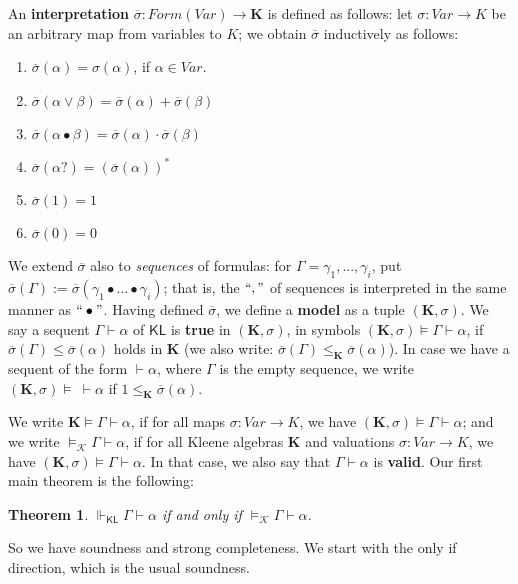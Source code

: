 \documentclass{eptcs}
\newtheorem{thm}[defn]{Theorem}
\newcommand{\KA}{\mathcal{K}}
\newcommand{\osigma}{\overline{\sigma}}
\newcommand{\KL}{\mathsf{KL}}
\begin{document}
An \textbf{interpretation} 
$\overline{\sigma}:\textit{Form}(\textit{Var})\rightarrow\textbf{K}$ is defined as
follows: let $\sigma:\textit{Var}\rightarrow K$ be an arbitrary
map from variables to $K$; 
we obtain $\overline{\sigma}$ inductively as follows:
\begin{enumerate}
\item $\osigma(\alpha)=\sigma(\alpha)$, if $\alpha\in \textit{Var}$.
\item $\osigma(\alpha\vee\beta)=\osigma(\alpha)+\osigma(\beta)$
\item $\osigma(\alpha\bullet\beta)=\osigma(\alpha)\cdot\osigma(\beta)$
\item $\osigma(\alpha?)=(\osigma(\alpha))^*$
\item $\osigma(1)=1$
\item $\osigma(0)=0$
\end{enumerate}

We extend $\osigma$ also to \textit{sequences} of formulas:
for $\Gamma=\gamma_1,...,\gamma_i$, put 
$\osigma(\Gamma):=\osigma(\gamma_1\bullet...\bullet\gamma_i)$;
that is, the $``,"$ of sequences is interpreted in the same manner
as $``\bullet"$.
Having defined $\osigma$, we define a \textbf{model} as a tuple
$(\textbf{K},\sigma)$. We say a sequent $\Gamma\vdash\alpha$ of $\KL$ is
\textbf{true} in $(\textbf{K},\sigma)$, in symbols
$(\textbf{K},\sigma)\models\Gamma\vdash\alpha$, if
$\osigma(\Gamma)\leq \osigma(\alpha)$ holds in $\textbf{K}$
(we also write: $\osigma(\Gamma)\leq_\textbf{K} \osigma(\alpha)$).
In case we have a sequent of the form $\vdash\alpha$, where
$\Gamma$ is the empty sequence, we write
$(\textbf{K},\sigma)\models\ \vdash\alpha$ if
$1\leq_{\textbf{K}}\osigma(\alpha)$.

We write $\textbf{K}\models\Gamma\vdash\alpha$, if for all maps
$\sigma:\textit{Var}\rightarrow K$, we have
$(\textbf{K},\sigma)\models\Gamma\vdash\alpha$; and we write
$\models_{\KA}\Gamma\vdash\alpha$, if for all Kleene algebras
$\textbf{K}$ and valuations $\sigma:\textit{Var}\rightarrow K$, we have
$(\textbf{K},\sigma)\models\Gamma\vdash\alpha$. In that case, 
we also say that $\Gamma\vdash\alpha$ is \textbf{valid}.
Our first main theorem is the following:

\begin{thm}
$\Vdash_{\KL}\Gamma\vdash\alpha$ if and only if 
$\models_{\KA}\Gamma\vdash\alpha$.
\end{thm}

So we have soundness and strong completeness. We start
with the only if direction, which is the usual soundness.
\end{document}
